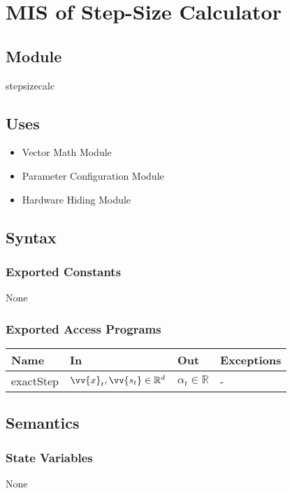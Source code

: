 \documentclass[12pt, titlepage]{article}
\begin{document}
\section{MIS of Step-Size Calculator}\label{Module:StepSizeCalc}

\subsection{Module}
stepsizecalc


\subsection{Uses}
\begin{itemize}
    \item Vector Math Module
    \item Parameter Configuration Module
    \item Hardware Hiding Module
\end{itemize}


\subsection{Syntax}

\subsubsection{Exported Constants}
None
\subsubsection{Exported Access Programs}

\begin{center}
\begin{tabular}{p{2cm} p{4cm} p{4cm} p{2cm}}
\hline
\textbf{Name} & \textbf{In} & \textbf{Out} & \textbf{Exceptions} \\
\hline
exactStep & $\vv{x}_{t}, \vv{s_t} \in \mathbb{R}^{d}$ & $\alpha_t \in \mathbb{R}$ & - \\
\hline
\end{tabular}
\end{center}

\subsection{Semantics}
\subsubsection{State Variables}
None
\end{document}
